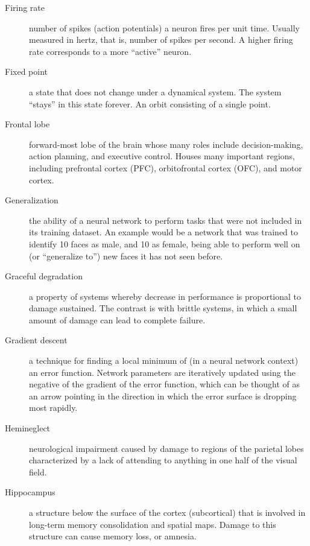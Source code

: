 \begin{description}
\item[Firing rate] number of spikes (action potentials) a neuron fires per unit time. Usually measured in hertz, that is, number of spikes per second. A higher firing rate corresponds to a more ``active'' neuron. 

\item[Fixed point] a state that does not change under a dynamical system. The system ``stays'' in this state forever. An orbit consisting of a single point.

\item[Frontal lobe] forward-most lobe of the brain whose many roles include decision-making, action planning, and executive control. Houses many important regions, including prefrontal cortex (PFC), orbitofrontal cortex (OFC), and motor cortex. 


\item[Generalization] the ability of a neural network to perform tasks that were not included in its training dataset. An example would be a network that was trained to identify 10 faces as male, and 10 as female, being able to perform well on (or ``generalize to'') new faces it has not seen before.


\item[Graceful degradation] a property of systems whereby decrease in performance is proportional to damage sustained. The contrast is with brittle systems, in which a small amount of damage can lead to complete failure.

\item[Gradient descent] a technique for finding a local minimum of (in a neural network context) an error function. Network parameters are iteratively updated using the negative of the gradient of the error function, which can be thought of as an arrow pointing in the direction in which the error surface is dropping most rapidly.


\item[Hemineglect] neurological impairment caused by damage to regions of the parietal lobes characterized by a lack of attending to anything in one half of the visual field.

\item[Hippocampus] a structure below the surface of the cortex (subcortical) that is involved in long-term memory consolidation and spatial maps. Damage to this structure can cause memory loss, or amnesia. 


\end{description}
